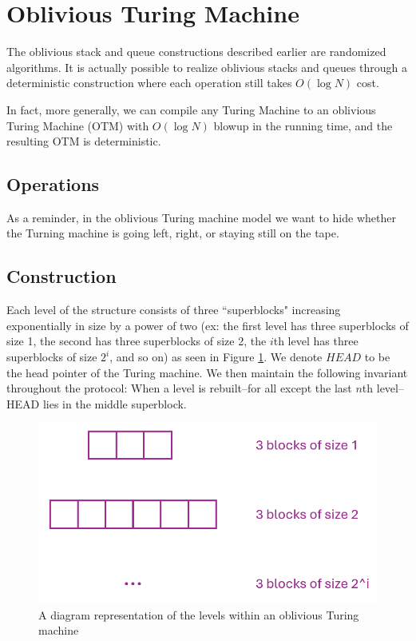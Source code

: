 \documentclass[11pt]{article}
\begin{document}
\section{Oblivious Turing Machine}

The oblivious stack and queue constructions
described earlier 
are randomized algorithms. 
It is actually possible to realize oblivious stacks
and queues through a deterministic 
construction where each operation still takes $O(\log N)$ cost. 

In fact, more generally, we can compile any Turing Machine
to an oblivious Turing Machine (OTM) with $O(\log N)$
blowup in the running time, and the resulting
OTM is deterministic.



\subsection{Operations}
As a reminder, in the oblivious Turing machine model we want to hide whether the Turning machine is going left, right, or staying still on the tape.

\subsection{Construction}
Each level of the structure consists of three ``superblocks" increasing exponentially in size by a power of two (ex: the first level has three superblocks of size 1, the second has three superblocks of size 2, the $i$th level has three superblocks of size $2^i$, and so on) as seen in Figure \ref{fig:turing_blocks}. We denote $HEAD$ to be the head pointer of the Turing machine. We then maintain the following invariant throughout the protocol: When a level is rebuilt--for all except the last $n$th level--HEAD lies in the middle superblock.

\begin{figure}
    \centering
    \includegraphics[scale=0.8]{blocks.png}
    \caption{A diagram representation of the levels within an oblivious Turing machine}
    \label{fig:turing_blocks}
\end{figure}
\end{document}
